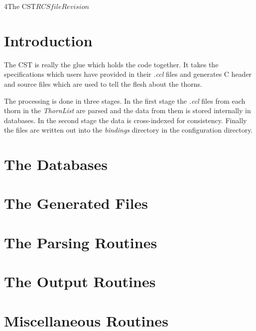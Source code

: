 %   

\begin{cactuspart}{4}{The CST}{$RCSfile$}{$Revision$}
\renewcommand{\thepage}{\Alph{part}\arabic{page}}

\chapter{Introduction}

The CST is really the glue which holds the code together.  It takes the 
specifications which users have provided in their {\em .ccl} files
and generates C header and source files which are used to tell the 
flesh about the thorns.

The processing is done in three stages.  In the first stage the {\em .ccl}
files from each thorn in the {\em ThornList} are parsed and the data from them
is stored internally in databases.  In the second stage the data is 
cross-indexed for consistency.  Finally the files are written out into the 
{\em bindings} directory in the configuration directory.

\chapter{The Databases}

\chapter{The Generated Files}

\chapter{The Parsing Routines}

\chapter{The Output Routines}

\chapter{Miscellaneous Routines}

\end{cactuspart}
